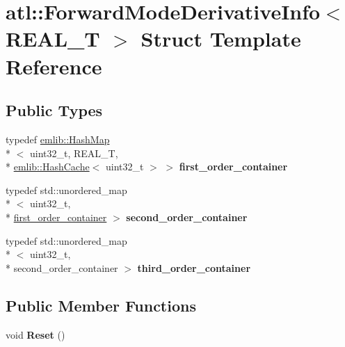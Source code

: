 \hypertarget{structatl_1_1_forward_mode_derivative_info}{\section{atl\+:\+:Forward\+Mode\+Derivative\+Info$<$ R\+E\+A\+L\+\_\+\+T $>$ Struct Template Reference}
\label{structatl_1_1_forward_mode_derivative_info}
}
\subsection*{Public Types}
\begin{DoxyCompactItemize}
\item 
\hypertarget{structatl_1_1_forward_mode_derivative_info_acbce660fede310f5314f9295db8046a8}{typedef \hyperlink{classemlib_1_1_hash_map}{emlib\+::\+Hash\+Map}\\*
$<$ uint32\+\_\+t, R\+E\+A\+L\+\_\+\+T, \\*
\hyperlink{classemlib_1_1_hash_cache}{emlib\+::\+Hash\+Cache}$<$ uint32\+\_\+t $>$ $>$ {\bfseries first\+\_\+order\+\_\+container}}\label{structatl_1_1_forward_mode_derivative_info_acbce660fede310f5314f9295db8046a8}

\item 
\hypertarget{structatl_1_1_forward_mode_derivative_info_a99a9b5b5b337db08943005e5bc421256}{typedef std\+::unordered\+\_\+map\\*
$<$ uint32\+\_\+t, \\*
\hyperlink{classemlib_1_1_hash_map}{first\+\_\+order\+\_\+container} $>$ {\bfseries second\+\_\+order\+\_\+container}}\label{structatl_1_1_forward_mode_derivative_info_a99a9b5b5b337db08943005e5bc421256}

\item 
\hypertarget{structatl_1_1_forward_mode_derivative_info_a62ec8782eb1560def78d72c08a1eb9b2}{typedef std\+::unordered\+\_\+map\\*
$<$ uint32\+\_\+t, \\*
second\+\_\+order\+\_\+container $>$ {\bfseries third\+\_\+order\+\_\+container}}\label{structatl_1_1_forward_mode_derivative_info_a62ec8782eb1560def78d72c08a1eb9b2}

\end{DoxyCompactItemize}
\subsection*{Public Member Functions}
\begin{DoxyCompactItemize}
\item 
\hypertarget{structatl_1_1_forward_mode_derivative_info_a237d60ec0fdaa0f9d1fbc4d99c8e6d33}{void {\bfseries Reset} ()}\label{structatl_1_1_forward_mode_derivative_info_a237d60ec0fdaa0f9d1fbc4d99c8e6d33}

\end{DoxyCompactItemize}
